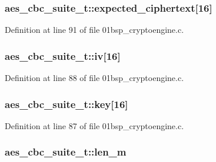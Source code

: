 \subsubsection[{\texorpdfstring{expected\+\_\+ciphertext}{expected_ciphertext}}]{ aes\+\_\+cbc\+\_\+suite\+\_\+t\+::expected\+\_\+ciphertext\mbox{[}16\mbox{]}}\hypertarget{structaes__cbc__suite__t_aa227c64388c0d33e5c5a297922ac40f5}{}\label{structaes__cbc__suite__t_aa227c64388c0d33e5c5a297922ac40f5}


Definition at line 91 of file 01bsp\+\_\+cryptoengine.\+c.

\subsubsection[{\texorpdfstring{iv}{iv}}]{ aes\+\_\+cbc\+\_\+suite\+\_\+t\+::iv\mbox{[}16\mbox{]}}\hypertarget{structaes__cbc__suite__t_ac2d1be7021cd9925fe1fd644a7e9fc01}{}\label{structaes__cbc__suite__t_ac2d1be7021cd9925fe1fd644a7e9fc01}


Definition at line 88 of file 01bsp\+\_\+cryptoengine.\+c.

\subsubsection[{\texorpdfstring{key}{key}}]{ aes\+\_\+cbc\+\_\+suite\+\_\+t\+::key\mbox{[}16\mbox{]}}\hypertarget{structaes__cbc__suite__t_a630d91fa2070a05d4f24ca0c9afe8902}{}\label{structaes__cbc__suite__t_a630d91fa2070a05d4f24ca0c9afe8902}


Definition at line 87 of file 01bsp\+\_\+cryptoengine.\+c.

\subsubsection[{\texorpdfstring{len\+\_\+m}{len_m}}]{ aes\+\_\+cbc\+\_\+suite\+\_\+t\+::len\+\_\+m}\hypertarget{structaes__cbc__suite__t_abc5b17b5efda1c3fd253ff8d276eda1e}{}\label{structaes__cbc__suite__t_abc5b17b5efda1c3fd253ff8d276eda1e}


